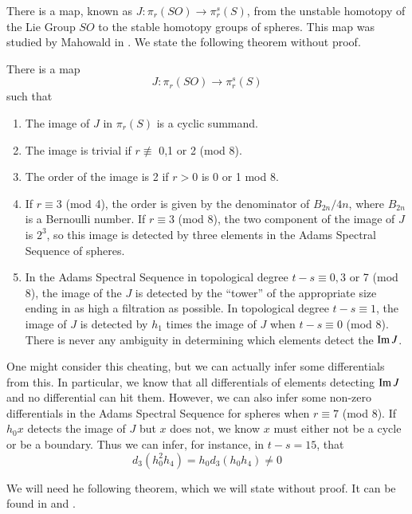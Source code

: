 There is a map, known as $J:\pi_r(SO)\to \pi_r^s(S)$, from the unstable homotopy of the Lie Group $SO$ to the stable homotopy groups of spheres.  This map was studied by Mahowald in \cite{imJ}.  We state the following theorem without proof.
\begin{Theorem}
  \label{sec:jthm}
  There is a map 
  \[J:\pi_r(SO)\to \pi_r^s(S)\]
  such that
  \begin{enumerate}
  \item The image of $J$ in $\pi_r(S)$ is a cyclic summand.
  \item The image is trivial if $r\not\equiv$ 0,1 or 2 (mod 8).  
  \item The order of the image is 2 if $r>0$ is 0 or 1 mod 8.  
  \item If $r\equiv 3$ (mod 4), the order is given by the denominator of $B_{2n}/4n$, where $B_{2n}$ is a Bernoulli number.  If $r\equiv 3$ (mod 8), the two component of the image of $J$ is $2^3$, so this image is detected by three elements in the Adams Spectral Sequence of spheres.  
  \item In the Adams Spectral Sequence in topological degree $t-s\equiv0,3$ or 7 (mod 8), the image of the $J$ is detected by the ``tower'' of the appropriate size ending in as high a filtration as possible.  In topological degree $t-s\equiv 1$, the image of $J$ is detected by $h_1$ times the image of $J$ when $t-s\equiv 0$ (mod 8).  
    There is never any ambiguity in determining which elements detect the $\operatorname{Im}\nolimits J$. 
  \end{enumerate}
\end{Theorem}


One might consider this cheating, but we can actually infer some differentials from this.
In particular, we know that all differentials of elements detecting $\operatorname{Im}\nolimits J$ and no differential can hit them.  However, we can also infer some non-zero differentials in the Adams Spectral Sequence for spheres when $r\equiv 7$ (mod 8).  
If $h_0x$ detects the image of $J$ but $x$ does not, we know $x$ must either not be a cycle or be a boundary.  Thus we can infer, for instance, in $t-s=15$, that
\[d_3(h_0^2h_4) = h_0d_3(h_0h_4)\ne 0\]


We will need he following theorem, which we will state without proof.  It can be found in \cite{milgramGroupReps} and \cite[V.2.14-V.2.17]{H00RingSpectra}.


